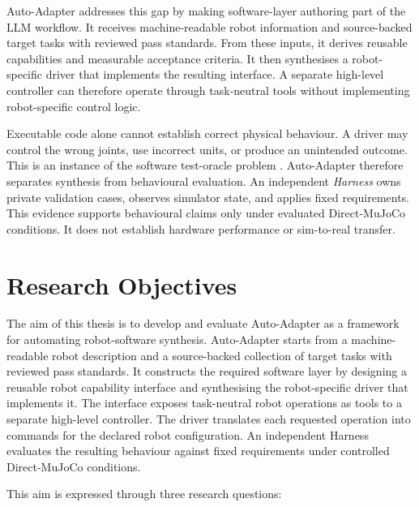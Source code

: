Auto-Adapter addresses this gap by making software-layer authoring part of the
LLM workflow. It receives machine-readable robot information and source-backed
target tasks with reviewed pass standards. From these inputs, it derives
reusable capabilities and measurable acceptance criteria. It then synthesises
a robot-specific driver that implements the resulting interface. A separate
high-level controller can therefore operate through task-neutral tools without
implementing robot-specific control logic.

Executable code alone cannot establish correct physical behaviour. A driver
may control the wrong joints, use incorrect units, or produce an unintended
outcome. This is an instance of the software test-oracle problem
\citep{barr2015oracle,araujo2023rasreview}. Auto-Adapter therefore separates
synthesis from behavioural evaluation. An independent \emph{Harness} owns
private validation cases, observes simulator state, and applies fixed
requirements. This evidence supports behavioural claims only under evaluated
Direct-MuJoCo conditions. It does not establish hardware performance or
sim-to-real transfer.



\section[Research Objectives]{Research Objectives}
\label{sec:research-objectives}

The aim of this thesis is to develop and evaluate Auto-Adapter as a framework
for automating robot-software synthesis. Auto-Adapter starts from a
machine-readable robot description and a source-backed collection of target
tasks with reviewed pass standards. It constructs the required software layer
by designing a reusable robot capability interface and synthesising the
robot-specific driver that implements it. The interface exposes task-neutral
robot operations as tools to a separate high-level controller. The driver
translates each requested operation into commands for the declared robot
configuration. An independent Harness evaluates the resulting behaviour
against fixed requirements under controlled Direct-MuJoCo conditions.

This aim is expressed through three research questions:

